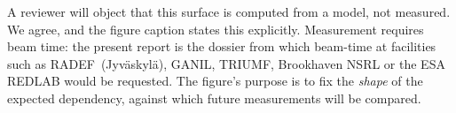 \begin{remark}
A reviewer will object that this surface is computed from a model,
not measured. We agree, and the figure caption states this
explicitly. Measurement requires beam time: the present report is
the dossier from which beam-time at facilities such as
RADEF~(Jyv\"askyl\"a), GANIL, TRIUMF, Brookhaven NSRL or the ESA
REDLAB would be requested. The figure's purpose is to fix the
\emph{shape} of the expected dependency, against which future
measurements will be compared.
\end{remark}
